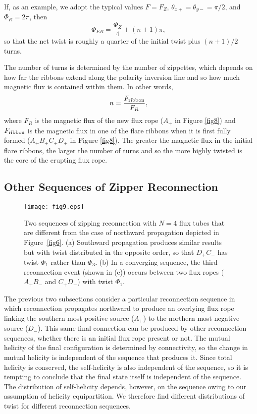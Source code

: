 \documentclass[10pt,namedreferneces]{SolarPhysics}
\begin{document}
\begin{article}
If, as an example, we adopt the typical values $F=F_Z$, $\theta_{x+} = \theta_{y-}=\pi/2$, and $\Phi_R=2\pi$, then
\begin{equation}
\Phi_{ER}=\frac{\Phi_{Z}}{4}+(n+1)\pi,
\end{equation}
so that the net twist is roughly a quarter of the initial twist plus $(n+1)/2$ turns. 

The number of turns is determined  by the number of zippettes, which depends on  how far the ribbons extend along the polarity inversion line and so how much magnetic flux is contained within them. In other words,
\begin{equation}
n=\frac{F_{\rm ribbon}}{F_R}, 
\label{number turns}
\end{equation}
where $F_R$ is the magnetic flux of the new flux rope ($A_+$ in Figure \ref{fig8}) and $F_{\rm ribbon}$ is the magnetic flux in one of the flare ribbons when it is first fully formed ($A_+B_+C_+D_+$ in Figure \ref{fig8}).
The greater the magnetic flux in the initial flare ribbons, the larger the number of turns and so the more highly twisted is the core of the erupting flux rope.

\subsection{\bf Other Sequences of Zipper Reconnection}
\label{sect_4.3}

\begin{figure}[h]
{\centering
 \texttt{[image: fig9.eps]}
\caption{Two sequences of zipping reconnection with $N=4$ flux tubes that are different from the case of northward propagation depicted in Figure\ \ref{fig6}.  (a) Southward propagation  produces similar results but with twist distributed in the opposite order, so that $D_+C_-$ has twist $\Phi_1$ rather than $\Phi_3$. (b) In a converging sequence, the third reconnection event (shown in (c)) occurs between two flux ropes ($A_+B_-$ and $C_+D_-$) with twist $\Phi_1$.}
\label{fig9}}
\end{figure}

The previous two subsections  consider a particular reconnection sequence in which reconnection propagates northward to produce an overlying flux rope linking the southern most positive source ($A_+$) to the northern most negative source ($D_-$).  This same final connection can be produced by other reconnection sequences, whether there is an initial flux rope present or not.  The mutual helicity of the final configuration is determined by connectivity, so the change in mutual helicity is independent of the sequence that produces it.   Since total helicity is conserved, the self-helicity is also  independent of the sequence, so it is tempting to conclude that the final state itself is independent of the sequence.  The distribution of self-helicity depends, however, on the sequence owing to our assumption of helicity equipartition.  We therefore find different distributions of twist for different reconnection sequences.  


\end{article}
\end{document}

